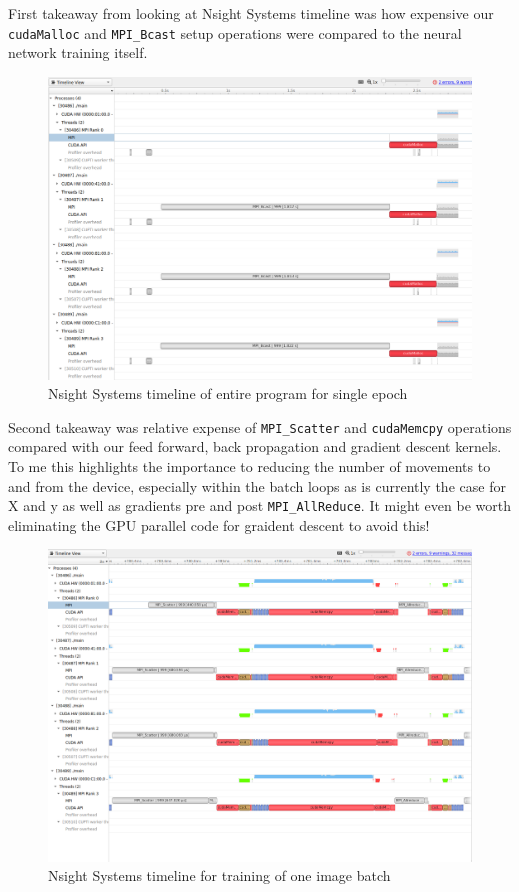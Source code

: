 \documentclass[12pt,letterpaper,twoside]{article}
\begin{document}
First takeaway from looking at Nsight Systems timeline was how expensive our 
\texttt{cudaMalloc} and \texttt{MPI\_Bcast} setup operations were compared to the 
neural network training itself. 

\begin{figure}[!htbp]
    \centering
    \includegraphics[scale=0.4]{nsight_systems_overview.png}
    \caption{Nsight Systems timeline of entire program for single epoch}
\end{figure}

Second takeaway was relative expense of \texttt{MPI\_Scatter} and \texttt{cudaMemcpy}
operations compared with our feed forward, back propagation and gradient descent kernels.
To me this highlights the importance to reducing the number of movements to and from the 
device, especially within the batch loops as is currently the case for X and y as well 
as gradients pre and post \texttt{MPI\_AllReduce}. It might even be worth eliminating 
the GPU parallel code for graident descent to avoid this!

\begin{figure}[!htbp]
    \centering
    \includegraphics[scale=0.4]{nsight_systems_batch.png}
    \caption{Nsight Systems timeline for training of one image batch}
\end{figure}
\end{document}
